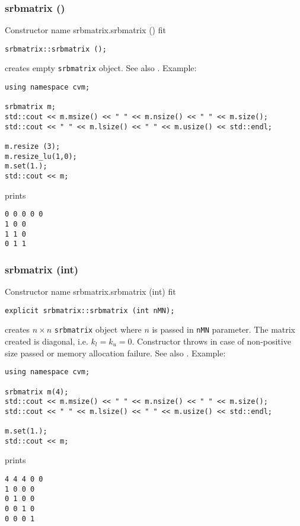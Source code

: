 \subsubsection{srbmatrix ()}
Constructor%
\pdfdest name {srbmatrix.srbmatrix ()} fit
\begin{verbatim}
srbmatrix::srbmatrix ();
\end{verbatim}
creates  empty \verb"srbmatrix" object.
See also .
Example:
\begin{Verbatim}
using namespace cvm;

srbmatrix m;
std::cout << m.msize() << " " << m.nsize() << " " << m.size();
std::cout << " " << m.lsize() << " " << m.usize() << std::endl;

m.resize (3);
m.resize_lu(1,0);
m.set(1.);
std::cout << m;
\end{Verbatim}
prints
\begin{Verbatim}
0 0 0 0 0
1 0 0
1 1 0
0 1 1
\end{Verbatim}
\newpage




\subsubsection{srbmatrix (int)}
Constructor%
\pdfdest name {srbmatrix.srbmatrix (int)} fit
\begin{verbatim}
explicit srbmatrix::srbmatrix (int nMN);
\end{verbatim}
creates $n\times n$ \verb"srbmatrix" object where $n$ is passed in
\verb"nMN" parameter. The matrix created is diagonal, i.e. $k_l=k_u=0$.
Constructor throws  
in case of non-positive size passed or memory allocation failure.
See also .
Example:
\begin{Verbatim}
using namespace cvm;

srbmatrix m(4);
std::cout << m.msize() << " " << m.nsize() << " " << m.size();
std::cout << " " << m.lsize() << " " << m.usize() << std::endl;

m.set(1.);
std::cout << m;
\end{Verbatim}
prints
\begin{Verbatim}
4 4 4 0 0
1 0 0 0
0 1 0 0
0 0 1 0
0 0 0 1
\end{Verbatim}
\newpage





